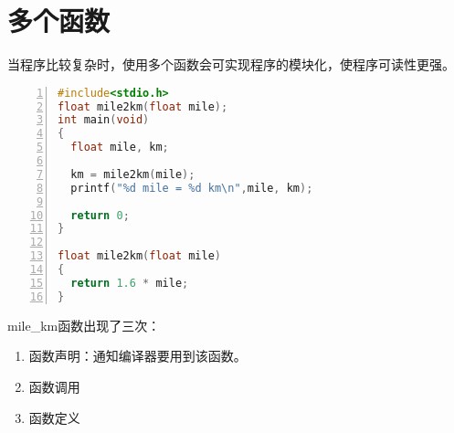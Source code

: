 \section{多个函数}
\begin{frame}[fragile]\ft{\secname}
  当程序比较复杂时，使用多个函数会可实现程序的模块化，使程序可读性更强。
\end{frame}
\begin{frame}\ft{\secname}
\begin{lstlisting}[language=c,numbers=left,frame=single]
#include<stdio.h>
float mile2km(float mile);
int main(void) 
{
  float mile, km;	
  
  km = mile2km(mile);
  printf("%d mile = %d km\n",mile, km);	
  	
  return 0;
}

float mile2km(float mile)
{
  return 1.6 * mile;
}
\end{lstlisting}
\end{frame}

\begin{frame}[fragile]\ft{\secname}
mile\_km函数出现了三次：\vspace{0.1in}

\begin{enumerate}
\item 函数声明：通知编译器要用到该函数。\\[0.1in]
\item 函数调用\\[0.1in]
\item 函数定义
\end{enumerate}
\end{frame}
